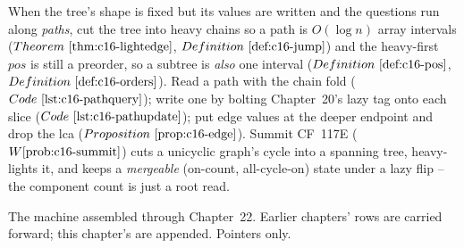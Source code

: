 \begin{recallbox}
When the tree's shape is fixed but its values are written and the questions run along
\emph{paths}, cut the tree into heavy chains so a path is \(O(\log n)\) array intervals
(\(\thmref{c16-lightedge}\), \(\defref{c16-jump}\)) and the heavy-first \(\mathit{pos}\) is still a
preorder, so a subtree is \emph{also} one interval (\(\defref{c16-pos}\), \(\defref{c16-orders}\)).
Read a path with the chain fold (\(\coderef{c16-pathquery}\)); write one by bolting Chapter~20's
lazy tag onto each slice (\(\coderef{c16-pathupdate}\)); put edge values at the deeper endpoint and
drop the lca (\(\propref{c16-edge}\)). Summit CF~117E (\(\probref{c16-summit}\)) cuts a unicyclic
graph's cycle into a spanning tree, heavy-lights it, and keeps a \emph{mergeable} (on-count,
all-cycle-on) state under a lazy flip -- the component count is just a root read.
\end{recallbox}



The machine assembled through Chapter~22. Earlier chapters' rows are carried forward;
this chapter's are appended. Pointers only.

